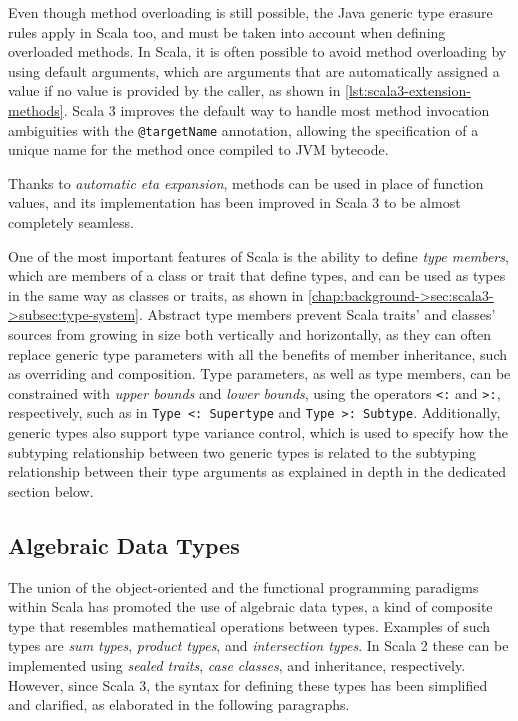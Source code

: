 Even though method overloading is still possible, the Java generic type erasure rules apply in Scala too, and must be taken into account when defining overloaded methods.
%
In Scala, it is often possible to avoid method overloading by using default arguments, which are arguments that are automatically assigned a value if no value is provided by the caller, as shown in \cref{lst:scala3-extension-methods}.
%
Scala 3 improves the default way to handle most method invocation ambiguities with the \texttt{@targetName} annotation, allowing the specification of a unique name for the method once compiled to \ac{JVM} bytecode.

Thanks to \textit{automatic eta expansion}, methods can be used in place of function values, and its implementation has been improved in Scala 3 to be almost completely seamless.

One of the most important features of Scala is the ability to define \textit{type members},
which are members of a class or trait that define types, and can be used as types in the same way as classes or traits, as shown in \cref{chap:background->sec:scala3->subsec:type-system}.
%
Abstract type members prevent Scala traits' and classes' sources from growing in size both vertically and horizontally, as they can often replace generic type parameters with all the benefits of member inheritance, such as overriding and composition.
%
Type parameters, as well as type members, can be constrained with \textit{upper bounds} and \textit{lower bounds}, using the operators \texttt{<:} and \texttt{>:}, respectively, such as in \texttt{Type <: Supertype} and \texttt{Type >: Subtype}.
%
Additionally, generic types also support type variance control, which is used to specify how the subtyping relationship between two generic types is related to the subtyping relationship between their type arguments as explained in depth in the dedicated section below.

\subsection{Algebraic Data Types}

The union of the object-oriented and the functional programming paradigms within Scala has promoted the use of algebraic data types, a kind of composite type that resembles mathematical operations between types.
%
Examples of such types are \textit{sum types}, \textit{product types}, and \textit{intersection types}.
%
In Scala 2 these can be implemented using \textit{sealed traits}, \textit{case classes}, and inheritance, respectively.
%
However, since Scala 3, the syntax for defining these types has been simplified and clarified, as elaborated in the following paragraphs.

